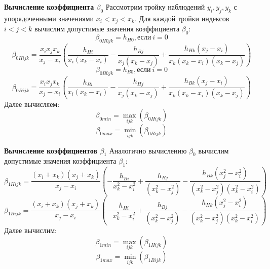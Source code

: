 \documentclass[a4paper,12pt]{article}
\begin{document}
    \noindent\textbf{Вычисление коэффициента $ \beta_{0} $}
    \newline
    Рассмотрим тройку наблюдений $ y_{i}, y_{j}, y_{k} $ с упорядоченными значениями $ x_{i} < x_{j} < x_{k} $.
    Для каждой тройки индексов $ i < j < k $ вычислим допустимые значения коэффициента $ \beta_{0} $:
    \begin{equation}
        \beta_{0H0jk} = h_{H0}, \text{если} \ i = 0
    \end{equation}
    \begin{equation}
        \beta_{0Hijk} = \frac{x_{i}x_{j}x_{k}}{x_{j} - x_{i}} (\frac{h_{Hi}}{x_{i}(x_{k} - x_{i})} - \frac{h_{Bj}}{x_{j}(x_{k} - x_{j})} + \frac{h_{Hk}(x_{j} - x_{i})}{x_{k}(x_{k} - x_{i})(x_{k} - x_{j})})
    \end{equation}
    \begin{equation}
        \beta_{0B0jk} = h_{B0}, \text{если} \ i = 0
    \end{equation}
    \begin{equation}
        \beta_{0Bijk} = \frac{x_{i}x_{j}x_{k}}{x_{j} - x_{i}} (\frac{h_{Bi}}{x_{i}(x_{k} - x_{i})} - \frac{h_{Hj}}{x_{j}(x_{k} - x_{j})} + \frac{h_{Bk}(x_{j} - x_{i})}{x_{k}(x_{k} - x_{i})(x_{k} - x_{j})})
    \end{equation}
    Далее вычисляем:
    \begin{equation}
        \beta_{0min} = \max_{ijk}(\beta_{0Hijk})
    \end{equation}
    \begin{equation}
        \beta_{0max} = \min_{ijk}(\beta_{0Bijk})
    \end{equation}

    \noindent\textbf{Вычисление коэффициентов $ \beta_{1} $}
    \newline
    Аналогично вычислению $ \beta_{0} $ вычислим допустимые значения коэффициента $ \beta_{1} $:
    \begin{equation}
        \beta_{1Hijk} = \frac{(x_{i} + x_{k})(x_{j} + x_{k})}{x_{j} - x_{i}} (-\frac{h_{Bi}}{x_{k}^{2} - x_{i}^{2}} + \frac{h_{Hj}}{(x_{k}^{2} - x_{j}^{2})} - \frac{h_{Bk}(x_{j}^{2} - x_{i}^{2})}{(x_{k}^{2} - x_{j}^{2})(x_{k}^{2} - x_{i}^{2})})
    \end{equation}
    \begin{equation}
        \beta_{1Bijk} = \frac{(x_{i} + x_{k})(x_{j} + x_{k})}{x_{j} - x_{i}} (-\frac{h_{Hi}}{x_{k}^{2} - x_{i}^{2}} + \frac{h_{Bj}}{(x_{k}^{2} - x_{j}^{2})} - \frac{h_{Hk}(x_{j}^{2} - x_{i}^{2})}{(x_{k}^{2} - x_{j}^{2})(x_{k}^{2} - x_{i}^{2})})
    \end{equation}
    Далее вычислим:
    \begin{equation}
        \beta_{1min} = \max_{ijk}(\beta_{1Hijk})
    \end{equation}
    \begin{equation}
        \beta_{1max} = \min_{ijk}(\beta_{1Bijk})
    \end{equation}
\end{document}
